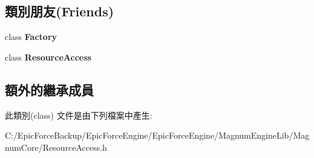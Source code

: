 \subsection*{類別朋友(Friends)}
\begin{DoxyCompactItemize}
\item 
class {\bfseries Factory}\hypertarget{class_magnum_1_1_resource_access_1_1_creator_a328c093d609680cca505905c6d49901a}{}\label{class_magnum_1_1_resource_access_1_1_creator_a328c093d609680cca505905c6d49901a}

\item 
class {\bfseries Resource\+Access}\hypertarget{class_magnum_1_1_resource_access_1_1_creator_a3a26a4a200b91c31f27b5e173018a17c}{}\label{class_magnum_1_1_resource_access_1_1_creator_a3a26a4a200b91c31f27b5e173018a17c}

\end{DoxyCompactItemize}
\subsection*{額外的繼承成員}


此類別(class) 文件是由下列檔案中產生\+:\begin{DoxyCompactItemize}
\item 
C\+:/\+Epic\+Force\+Backup/\+Epic\+Force\+Engine/\+Epic\+Force\+Engine/\+Magnum\+Engine\+Lib/\+Magnum\+Core/Resource\+Access.\+h\end{DoxyCompactItemize}
